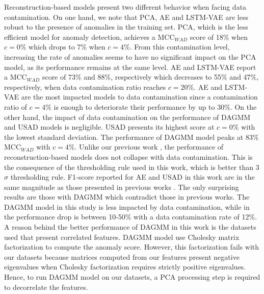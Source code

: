 Reconstruction-based models present two different behavior when facing data contamination. On one hand, we note that PCA, AE and LSTM-VAE are less robust to the presence of anomalies in the training set. PCA, which is the less efficient model for anomaly detection, achieves a MCC$_{WAD}$ score of 18\% when $c=0\%$ which drops to 7\% when $c=4\%$. From this contamination level, increasing the rate of anomalies seems to have no significant impact on the PCA model, as its performance remains at the same level. AE and LSTM-VAE report a MCC$_{WAD}$ score of 73\% and 88\%, respectively which decreases to 55\% and 47\%, respectively, when data contamination ratio reaches $c=20\%$. AE and LSTM-VAE are the most impacted models to data contamination since a contamination ratio of $c=4\%$ is enough to deteriorate their performance by up to 30\%. On the other hand, the impact of data contamination on the performance of DAGMM and USAD models is negligible. USAD presents its highest score at $c=0\%$  with the lowest standard deviation. The performance of DAGMM model peaks at 83\% MCC$_{WAD}$ with $c=4\%$.
Unlike our previous work \cite{Ky2022}, the performance of reconstruction-based models does not collapse with data contamination. This is the consequence of the thresholding rule used in this work, which is better than 3$\sigma$ thresholding rule. F1-score reported for AE and USAD in this work are in the same magnitude as those presented in previous works \cite{Nkashama2022RobustnessEO, audibert2020usad}. The only surprising results are those with DAGMM which contradict those in previous works. The DAGMM model in this study is less impacted by data contamination, while in \cite{zong2018deep, Nkashama2022RobustnessEO, Johari2022AnomalyDA} the performance drop is between 10-50\% with a data contamination rate of 12\%. A reason behind the better performance of DAGMM in this work is the datasets used that present correlated features. DAGMM model use Cholesky matrix factorization to compute the anomaly score. However, this factorization fails with our datasets because matrices computed from our features present negative eigenvalues when Cholesky factorization requires strictly positive eigenvalues. Hence, to run DAGMM model on our datasets, a PCA processing step is required to decorrelate the features.


